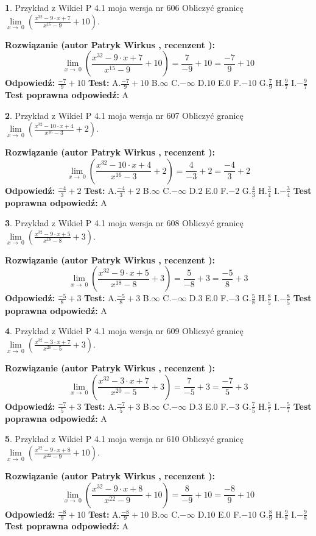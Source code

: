 \documentclass[12pt, a4paper]{article}
\theoremstyle{definition} %
\newtheorem{zad}{}
\newcommand{\zadStart}[1]{\begin{zad}#1\newline}
\newcommand{\zadStop}{\end{zad}}
\newcommand{\rozwStart}[2]{\noindent \textbf{Rozwiązanie (autor #1 , recenzent #2): }\newline}
\newcommand{\rozwStop}{\newline}
\newcommand{\odpStart}{\noindent \textbf{Odpowiedź:}\newline}
\newcommand{\odpStop}{\newline}
\newcommand{\testStart}{\noindent \textbf{Test:}\newline}
\newcommand{\testStop}{\newline}
\newcommand{\kluczStart}{\noindent \textbf{Test poprawna odpowiedź:}\newline}
\newcommand{\kluczStop}{\newline}
\begin{document}
\zadStart{Przykład z Wikieł P 4.1 moja wersja nr 606}
Obliczyć granicę $\lim\limits_{x\to\ 0}(\frac{x^{32}-9 \cdot x +7}{x^{15}-9}+10)$.
\zadStop
\rozwStart{Patryk Wirkus}{}
$$\lim\limits_{x\to\ 0}(\frac{x^{32}-9 \cdot x +7}{x^{15}-9}+10)=\frac{7}{-9}+10=\frac{-7}{9}+10$$
\rozwStop
\odpStart
$\frac{-7}{9}+10$
\odpStop
\testStart
A.$\frac{-7}{9}+10$
B.$\infty$
C.$-\infty$
D.$10$
E.$0$
F.$-10$
G.$\frac{7}{9}$
H.$\frac{9}{7}$
I.$-\frac{9}{7}$
\testStop
\kluczStart
A
\kluczStop



\zadStart{Przykład z Wikieł P 4.1 moja wersja nr 607}
Obliczyć granicę $\lim\limits_{x\to\ 0}(\frac{x^{32}-10 \cdot x +4}{x^{16}-3}+2)$.
\zadStop
\rozwStart{Patryk Wirkus}{}
$$\lim\limits_{x\to\ 0}(\frac{x^{32}-10 \cdot x +4}{x^{16}-3}+2)=\frac{4}{-3}+2=\frac{-4}{3}+2$$
\rozwStop
\odpStart
$\frac{-4}{3}+2$
\odpStop
\testStart
A.$\frac{-4}{3}+2$
B.$\infty$
C.$-\infty$
D.$2$
E.$0$
F.$-2$
G.$\frac{4}{3}$
H.$\frac{3}{4}$
I.$-\frac{3}{4}$
\testStop
\kluczStart
A
\kluczStop



\zadStart{Przykład z Wikieł P 4.1 moja wersja nr 608}
Obliczyć granicę $\lim\limits_{x\to\ 0}(\frac{x^{32}-9 \cdot x +5}{x^{18}-8}+3)$.
\zadStop
\rozwStart{Patryk Wirkus}{}
$$\lim\limits_{x\to\ 0}(\frac{x^{32}-9 \cdot x +5}{x^{18}-8}+3)=\frac{5}{-8}+3=\frac{-5}{8}+3$$
\rozwStop
\odpStart
$\frac{-5}{8}+3$
\odpStop
\testStart
A.$\frac{-5}{8}+3$
B.$\infty$
C.$-\infty$
D.$3$
E.$0$
F.$-3$
G.$\frac{5}{8}$
H.$\frac{8}{5}$
I.$-\frac{8}{5}$
\testStop
\kluczStart
A
\kluczStop



\zadStart{Przykład z Wikieł P 4.1 moja wersja nr 609}
Obliczyć granicę $\lim\limits_{x\to\ 0}(\frac{x^{32}-3 \cdot x +7}{x^{20}-5}+3)$.
\zadStop
\rozwStart{Patryk Wirkus}{}
$$\lim\limits_{x\to\ 0}(\frac{x^{32}-3 \cdot x +7}{x^{20}-5}+3)=\frac{7}{-5}+3=\frac{-7}{5}+3$$
\rozwStop
\odpStart
$\frac{-7}{5}+3$
\odpStop
\testStart
A.$\frac{-7}{5}+3$
B.$\infty$
C.$-\infty$
D.$3$
E.$0$
F.$-3$
G.$\frac{7}{5}$
H.$\frac{5}{7}$
I.$-\frac{5}{7}$
\testStop
\kluczStart
A
\kluczStop



\zadStart{Przykład z Wikieł P 4.1 moja wersja nr 610}
Obliczyć granicę $\lim\limits_{x\to\ 0}(\frac{x^{32}-9 \cdot x +8}{x^{22}-9}+10)$.
\zadStop
\rozwStart{Patryk Wirkus}{}
$$\lim\limits_{x\to\ 0}(\frac{x^{32}-9 \cdot x +8}{x^{22}-9}+10)=\frac{8}{-9}+10=\frac{-8}{9}+10$$
\rozwStop
\odpStart
$\frac{-8}{9}+10$
\odpStop
\testStart
A.$\frac{-8}{9}+10$
B.$\infty$
C.$-\infty$
D.$10$
E.$0$
F.$-10$
G.$\frac{8}{9}$
H.$\frac{9}{8}$
I.$-\frac{9}{8}$
\testStop
\kluczStart
A
\kluczStop
\end{document}

